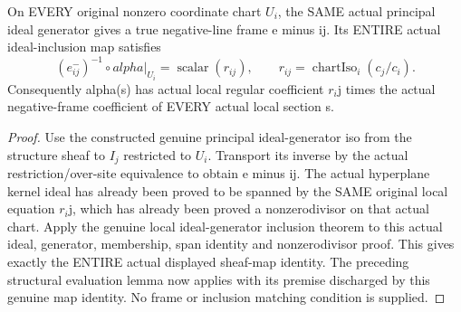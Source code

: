 \begin{lemma}
\label{lem:seven-native-negative-actual-ideal-frame}
\leanok
On EVERY original nonzero coordinate chart $U_i$, the SAME actual principal
ideal generator gives a true negative-line frame e minus ij. Its ENTIRE
actual ideal-inclusion map satisfies
\[
 (e^-_{ij})^{-1}\circ alpha|_{U_i}
       =\operatorname{scalar}(r_{ij}),\qquad
 r_{ij}=\operatorname{chartIso}_i(c_j/c_i).
\]
Consequently alpha(s) has actual local regular coefficient $r_i$j times
the actual negative-frame coefficient of EVERY actual local section s.
\end{lemma}
\begin{proof}
Use the constructed genuine principal ideal-generator iso
from the structure sheaf to $I_j$ restricted to $U_i$. Transport its inverse
by the actual restriction/over-site equivalence to obtain e minus ij.
The actual hyperplane kernel ideal has already been proved to be spanned
by the SAME original local equation $r_i$j, which has already been proved
a nonzerodivisor on that actual chart. Apply the genuine local
ideal-generator inclusion theorem to this actual ideal, generator,
membership, span identity and nonzerodivisor proof. This gives exactly
the ENTIRE actual displayed sheaf-map identity. The preceding structural
evaluation lemma now applies with its premise discharged by this genuine
map identity. No frame or inclusion matching condition is supplied.
\end{proof}

